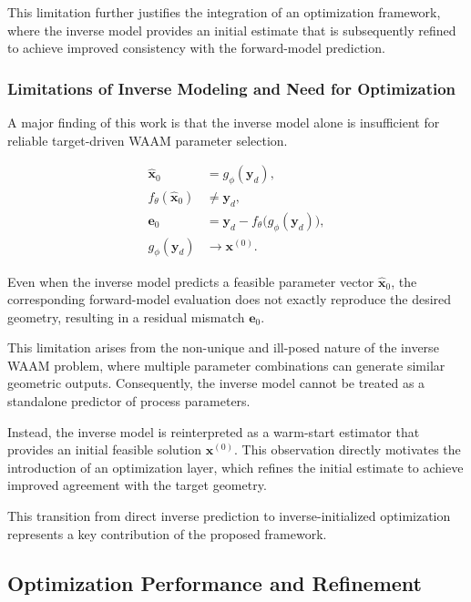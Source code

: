 \documentclass[11pt]{article}
\begin{document}
This limitation further justifies the integration of an optimization framework, where the inverse model provides an initial estimate that is subsequently refined to achieve improved consistency with the forward-model prediction.


\subsubsection{Limitations of Inverse Modeling and Need for Optimization}

A major finding of this work is that the inverse model alone is insufficient for reliable target-driven WAAM parameter selection.

\begin{tcolorbox}[colback=white,colframe=black,boxrule=0.5pt,arc=2pt]
\small
\begin{equation}
\begin{aligned}
\hat{\mathbf{x}}_{0} &= g_{\phi}(\mathbf{y}_{d}), \\
f_{\theta}(\hat{\mathbf{x}}_{0}) &\neq \mathbf{y}_{d}, \\
\mathbf{e}_{0} &= \mathbf{y}_{d} - f_{\theta}\big(g_{\phi}(\mathbf{y}_{d})\big), \\
g_{\phi}(\mathbf{y}_{d}) &\rightarrow \mathbf{x}^{(0)}.
\end{aligned}
\end{equation}
\end{tcolorbox}

Even when the inverse model predicts a feasible parameter vector $\hat{\mathbf{x}}_{0}$, the corresponding forward-model evaluation does not exactly reproduce the desired geometry, resulting in a residual mismatch $\mathbf{e}_{0}$. 

This limitation arises from the non-unique and ill-posed nature of the inverse WAAM problem, where multiple parameter combinations can generate similar geometric outputs. Consequently, the inverse model cannot be treated as a standalone predictor of process parameters.

Instead, the inverse model is reinterpreted as a warm-start estimator that provides an initial feasible solution $\mathbf{x}^{(0)}$. This observation directly motivates the introduction of an optimization layer, which refines the initial estimate to achieve improved agreement with the target geometry.

This transition from direct inverse prediction to inverse-initialized optimization represents a key contribution of the proposed framework.
\subsection{Optimization Performance and Refinement}
\end{document}

